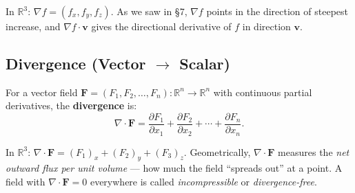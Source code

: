 \documentclass[11pt]{report}
\newcommand{\R}{\mathbb{R}}
\newcommand{\parti}[2]{\frac{\partial #1}{\partial #2}}
\begin{document}
In $\R^3$: $\nabla f = (f_x, f_y, f_z)$. As we saw in \S7, $\nabla f$ points in the direction of steepest increase, and $\nabla f \cdot \mathbf{v}$ gives the directional derivative of $f$ in direction $\mathbf{v}$.

\subsection*{Divergence (Vector $\to$ Scalar)}

For a vector field $\mathbf{F} = (F_1, F_2, \ldots, F_n): \R^n \to \R^n$ with continuous partial derivatives, the \textbf{divergence} is:
\[
\nabla \cdot \mathbf{F} = \parti{F_1}{x_1} + \parti{F_2}{x_2} + \cdots + \parti{F_n}{x_n}.
\]

In $\R^3$: $\nabla \cdot \mathbf{F} = (F_1)_x + (F_2)_y + (F_3)_z$. Geometrically, $\nabla \cdot \mathbf{F}$ measures the \textit{net outward flux per unit volume} --- how much the field ``spreads out'' at a point. A field with $\nabla \cdot \mathbf{F} = 0$ everywhere is called \textit{incompressible} or \textit{divergence-free}.
\end{document}
